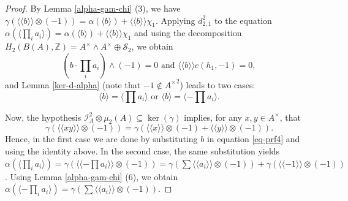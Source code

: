 \documentclass[11pt]{amsart}
\theoremstyle{definition}
\theoremstyle{plain}
\theoremstyle{definition}
\numberwithin{equation}{section}
\newcommand{\z}{\mathbb{Z}}
\newcommand{\II}{\mathcal{I}}
\renewcommand{\SS}{\mathcal{S}}
\renewcommand{\aa}{{A^\times}}
\newcommand{\lan}{\langle}
\newcommand{\ran}{\rangle}
\newcommand{\Lan}{\langle \! \langle}
\newcommand{\Ran}{\rangle \! \rangle}
\begin{document}
\begin{proof}
		By Lemma \ref{alpha-gam-chi} (3), we have $\gamma(\Lan b\Ran\otimes(-1))=\alpha(\lan b\ran)+\Lan b\Ran\chi_1$. Applying $d^2_{2,1}$ to the equation $\alpha(\lan\prod_{i}a_i\ran)=\alpha(\lan b\ran)+\Lan b\Ran\chi_1$ and using the decomposition $H_2(B(A),\z)=\aa\wedge\aa\oplus \SS_2$, we obtain
		\[
		(b\cdot\prod_ia_i)\wedge (-1)=0 \text{ and } \Lan b\Ran c(h_1,-1)=0,
		\]
		and Lemma \ref{ker-d-alpha} (note that $-1\notin\aa^2$) leads to two cases:
		\[
		\lan b\ran=\lan\prod a_i\ran\text{ or } \lan b\ran=\lan-\prod a_i\ran.
		\]
		
		Now, the hypothesis $\II_A^2\otimes\mu_2(A)\subseteq\ker(\gamma)$ implies, for any $x,y\in\aa$, that
		\[
		\gamma(\Lan xy\Ran\otimes(-1))=\gamma(\Lan x\Ran\otimes(-1)+\Lan y\Ran\otimes(-1)).
		\]
		Hence, in the first case we are done by substituting $b$ in equation \eqref{eq-prf4} and using the identity above. In the second case, the same substitution yields $\alpha(\lan\prod_{i}a_i\ran)=\gamma(\Lan -\prod a_i\Ran\otimes(-1))=\gamma(\sum\Lan a_i\Ran\otimes(-1))+\gamma(\Lan -1\Ran\otimes(-1))$. Using Lemma \ref{alpha-gam-chi} (6), we obtain $\alpha(\lan-\prod_{i}a_i\ran)=\gamma(\sum\Lan a_i\Ran\otimes(-1))$. 
	\end{proof}
\end{document}
